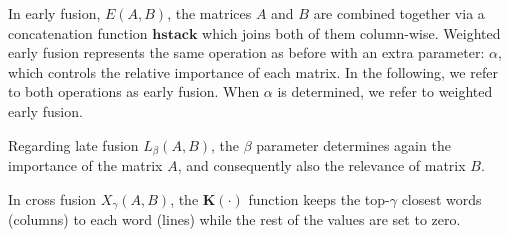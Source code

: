In early fusion, $E(A,B)$, the matrices $A$ and $B$ are combined together via a concatenation function $\mathbf{hstack}$ which joins both of them column-wise. Weighted early fusion  represents the same operation as before with an extra parameter: $\alpha$, which controls the relative importance of each matrix. In the following, we refer to both operations as early fusion. When $\alpha$ is determined, we refer to weighted early fusion.

Regarding late fusion $L_\beta(A,B)$, the  $\beta$ parameter determines again the importance of the  matrix $A$,  and consequently also the relevance of matrix $B$.

In cross fusion $X_\gamma(A,B)$, the $\mathbf{K}(\cdot)$ function keeps the top-$\gamma$ closest words (columns) to each word (lines) while the rest of the values are set to zero. 

